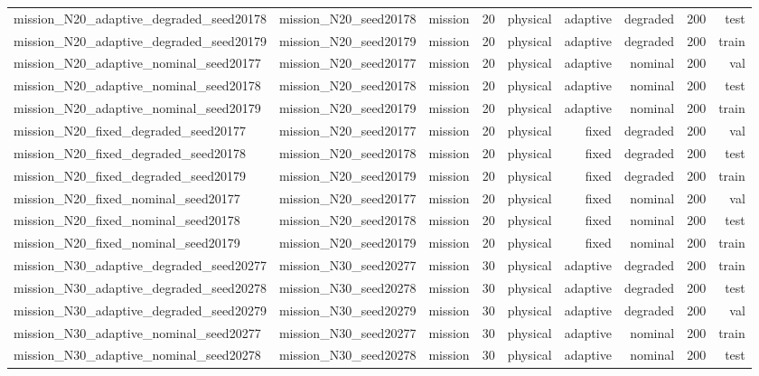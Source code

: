 \begin{tabular}{lrrrrrrrr}
mission\_N20\_adaptive\_degraded\_seed20178 & mission\_N20\_seed20178 & mission & 20 & physical & adaptive & degraded & 200 & test \\
mission\_N20\_adaptive\_degraded\_seed20179 & mission\_N20\_seed20179 & mission & 20 & physical & adaptive & degraded & 200 & train \\
mission\_N20\_adaptive\_nominal\_seed20177 & mission\_N20\_seed20177 & mission & 20 & physical & adaptive & nominal & 200 & val \\
mission\_N20\_adaptive\_nominal\_seed20178 & mission\_N20\_seed20178 & mission & 20 & physical & adaptive & nominal & 200 & test \\
mission\_N20\_adaptive\_nominal\_seed20179 & mission\_N20\_seed20179 & mission & 20 & physical & adaptive & nominal & 200 & train \\
mission\_N20\_fixed\_degraded\_seed20177 & mission\_N20\_seed20177 & mission & 20 & physical & fixed & degraded & 200 & val \\
mission\_N20\_fixed\_degraded\_seed20178 & mission\_N20\_seed20178 & mission & 20 & physical & fixed & degraded & 200 & test \\
mission\_N20\_fixed\_degraded\_seed20179 & mission\_N20\_seed20179 & mission & 20 & physical & fixed & degraded & 200 & train \\
mission\_N20\_fixed\_nominal\_seed20177 & mission\_N20\_seed20177 & mission & 20 & physical & fixed & nominal & 200 & val \\
mission\_N20\_fixed\_nominal\_seed20178 & mission\_N20\_seed20178 & mission & 20 & physical & fixed & nominal & 200 & test \\
mission\_N20\_fixed\_nominal\_seed20179 & mission\_N20\_seed20179 & mission & 20 & physical & fixed & nominal & 200 & train \\
mission\_N30\_adaptive\_degraded\_seed20277 & mission\_N30\_seed20277 & mission & 30 & physical & adaptive & degraded & 200 & train \\
mission\_N30\_adaptive\_degraded\_seed20278 & mission\_N30\_seed20278 & mission & 30 & physical & adaptive & degraded & 200 & test \\
mission\_N30\_adaptive\_degraded\_seed20279 & mission\_N30\_seed20279 & mission & 30 & physical & adaptive & degraded & 200 & val \\
mission\_N30\_adaptive\_nominal\_seed20277 & mission\_N30\_seed20277 & mission & 30 & physical & adaptive & nominal & 200 & train \\
mission\_N30\_adaptive\_nominal\_seed20278 & mission\_N30\_seed20278 & mission & 30 & physical & adaptive & nominal & 200 & test \\

\end{tabular}
